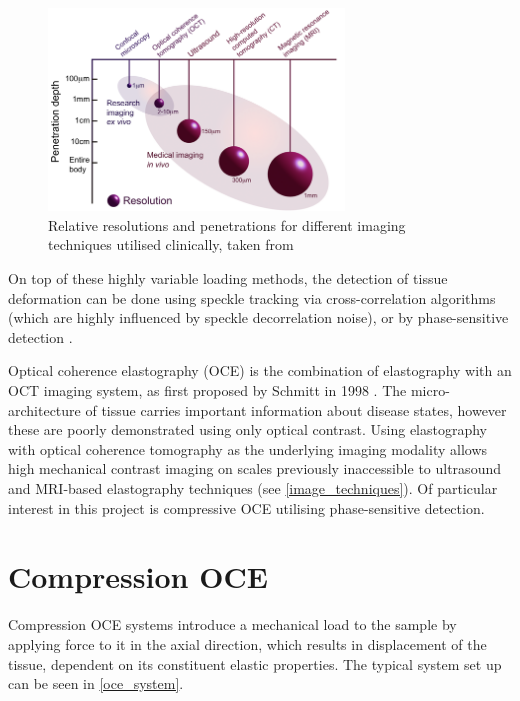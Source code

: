 \begin{figure}[t]
	\centering
    	\includegraphics[width=0.7\textwidth]{bground_figs/technique_comparison.png}
    	\caption{Relative resolutions and penetrations for different imaging techniques utilised clinically, taken from \cite{optical+biomedical_engineering_laboratory_introduction_nodate}}
    	\label{image_techniques}	
\end{figure}

On top of these highly variable loading methods, the detection of tissue deformation can be done using speckle tracking via cross-correlation algorithms (which are highly influenced by speckle decorrelation noise), or by phase-sensitive detection \cite{kennedy_strain_2012}.

Optical coherence elastography (OCE) is the combination of elastography with an OCT imaging system, as first proposed by Schmitt in 1998 \cite{schmitt_oct_1998}. The micro-architecture of tissue carries important information about disease states, however these are poorly demonstrated using only optical contrast. Using elastography with optical coherence tomography as the underlying imaging modality allows high mechanical contrast imaging on scales previously inaccessible to ultrasound and MRI-based elastography techniques (see \autoref{image_techniques}). Of particular interest in this project is compressive OCE utilising phase-sensitive detection. 

\section{Compression OCE}\label{compression_oce}    

Compression OCE systems introduce a mechanical load to the sample by applying force to it in the axial direction, which results in displacement of the tissue, dependent on its constituent elastic properties. The typical system set up can be seen in \autoref{oce_system}.

